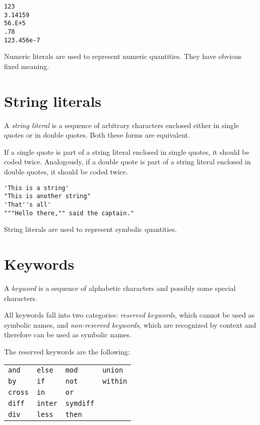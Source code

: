 \documentclass[11pt]{report}
\def\para#1{\noindent{\bf#1}}
\begin{document}
\para{Examples}

\begin{verbatim}
123
3.14159
56.E+5
.78
123.456e-7
\end{verbatim}

Numeric literals are used to represent numeric quantities. They have
obvious fixed meaning.

\section{String literals}

A {\it string literal} is a sequence of arbitrary characters enclosed
either in single quotes or in double quotes. Both these forms are
equivalent.

If a single quote is part of a string literal enclosed in single
quotes, it should be coded twice. Analogously, if a double quote is
part of a string literal enclosed in double quotes, it should be coded
twice.

\para{Examples}

\begin{verbatim}
'This is a string'
"This is another string"
'That''s all'
"""Hello there,"" said the captain."
\end{verbatim}

String literals are used to represent symbolic quantities.

\section{Keywords}

A {\it keyword} is a sequence of alphabetic characters and possibly
some special characters.

All keywords fall into two categories: {\it reserved keywords}, which
cannot be used as symbolic names, and {\it non-reserved keywords},
which are recognized by context and therefore can be used as symbolic
names.

The reserved keywords are the following:

\noindent\hfil
\begin{tabular}{@{}p{.7in}p{.7in}p{.7in}p{.7in}@{}}
{\tt and}&{\tt else}&{\tt mod}&{\tt union}\\
{\tt by}&{\tt if}&{\tt not}&{\tt within}\\
{\tt cross}&{\tt in}&{\tt or}\\
{\tt diff}&{\tt inter}&{\tt symdiff}\\
{\tt div}&{\tt less}&{\tt then}\\
\end{tabular}
\end{document}
